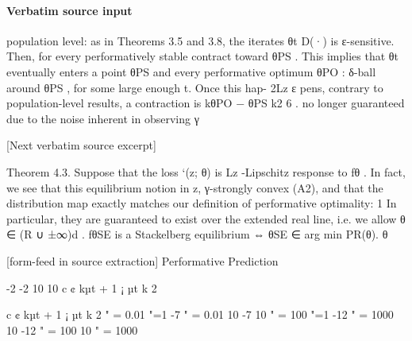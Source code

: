 \documentclass[10pt]{article}
\begin{document}
\paragraph{Verbatim source input}
\begin{ReviewVerbatim}
population level: as in Theorems 3.5 and 3.8, the iterates θt         D(·) is ε-sensitive. Then, for every performatively stable
contract toward θPS . This implies that θt eventually enters a        point θPS and every performative optimum θPO :
δ-ball around θPS , for some large enough t. Once this hap-
                                                                                                            2Lz ε
pens, contrary to population-level results, a contraction is                            kθPO − θPS k2 6           .
no longer guaranteed due to the noise inherent in observing                                                  γ

[Next verbatim source excerpt]

Theorem 4.3. Suppose that the loss `(z; θ) is Lz -Lipschitz           response to fθ . In fact, we see that this equilibrium notion
in z, γ-strongly convex (A2), and that the distribution map           exactly matches our deﬁnition of performative optimality:
    1
      In particular, they are guaranteed to exist over the extended
real line, i.e. we allow θ ∈ (R ∪ {±∞})d .                            fθSE is a Stackelberg equilibrium ⇔ θSE ∈ arg min PR(θ).
                                                                                                                         θ

[form-feed in source extraction]
                                                                   Performative Prediction



                                                                                                         -2
                                -2                                                                  10
                           10
        c ¢ kµt + 1 ¡ µt k 2




                                                                                 c ¢ kµt + 1 ¡ µt k 2
                                                                  " = 0.01
                                                                  "=1                                    -7                                 " = 0.01
                           10
                                -7                                                                  10
                                                                  " = 100                                                                   "=1
                               -12                                " = 1000                      10
                                                                                                        -12                                 " = 100
                       10
                                                                                                                                            " = 1000


\end{ReviewVerbatim}
\end{document}
